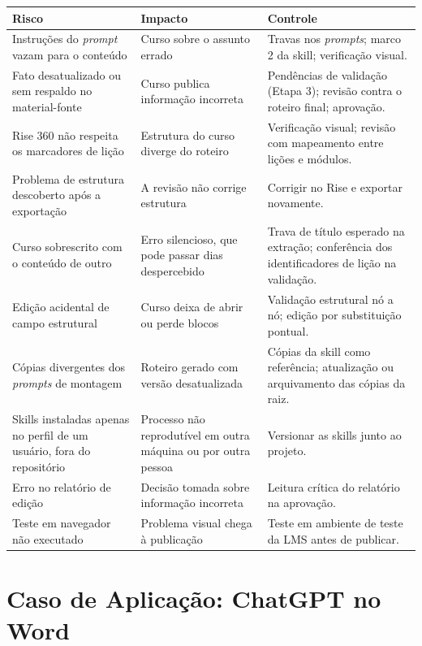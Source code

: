 \documentclass[12pt,a4paper]{article}
\begin{document}
\begingroup\small
\renewcommand{\arraystretch}{1.3}
\begin{longtable}{@{}L{0.32\textwidth}L{0.28\textwidth}L{0.34\textwidth}@{}}
\toprule
\textbf{Risco} & \textbf{Impacto} & \textbf{Controle} \\
\midrule
\endhead
\bottomrule
\endlastfoot
Instruções do \textit{prompt} vazam para o conteúdo & Curso sobre o assunto errado & Travas nos \textit{prompts}; marco 2 da skill; verificação visual. \\
\addlinespace
Fato desatualizado ou sem respaldo no material-fonte & Curso publica informação incorreta & Pendências de validação (Etapa 3); revisão contra o roteiro final; aprovação. \\
\addlinespace
Rise 360 não respeita os marcadores de lição & Estrutura do curso diverge do roteiro & Verificação visual; revisão com mapeamento entre lições e módulos. \\
\addlinespace
Problema de estrutura descoberto após a exportação & A revisão não corrige estrutura & Corrigir no Rise e exportar novamente. \\
\addlinespace
Curso sobrescrito com o conteúdo de outro & Erro silencioso, que pode passar dias despercebido & Trava de título esperado na extração; conferência dos identificadores de lição na validação. \\
\addlinespace
Edição acidental de campo estrutural & Curso deixa de abrir ou perde blocos & Validação estrutural nó a nó; edição por substituição pontual. \\
\addlinespace
Cópias divergentes dos \textit{prompts} de montagem & Roteiro gerado com versão desatualizada & Cópias da skill como referência; atualização ou arquivamento das cópias da raiz. \\
\addlinespace
Skills instaladas apenas no perfil de um usuário, fora do repositório & Processo não reprodutível em outra máquina ou por outra pessoa & Versionar as skills junto ao projeto. \\
\addlinespace
Erro no relatório de edição & Decisão tomada sobre informação incorreta & Leitura crítica do relatório na aprovação. \\
\addlinespace
Teste em navegador não executado & Problema visual chega à publicação & Teste em ambiente de teste da LMS antes de publicar. \\
\end{longtable}
\endgroup

\section{Caso de Aplicação: ChatGPT no Word}\label{sec:caso}
\end{document}
